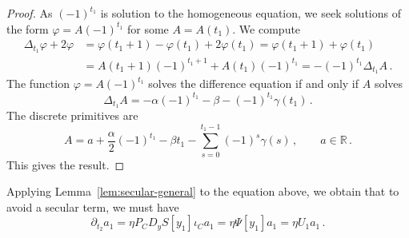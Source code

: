 \documentclass[11pt,english,reqno]{article}
\newcommand{\R}{\mathbb{R}}
\theoremstyle{plain}
\theoremstyle{definition}
\theoremstyle{remark}
\numberwithin{equation}{section}
\begin{document}
    \begin{proof}
        As $(-1)^{t_1}$ is solution to the homogeneous equation, we seek solutions of the form $\varphi = A(-1)^{t_1}$ for some $A = A(t_1)$. We compute
        \begin{align*}
            \Delta_{t_1} \varphi + 2 \varphi &= \varphi(t_1 + 1) - \varphi(t_1) + 2 \varphi(t_1) = \varphi(t_1 + 1) + \varphi(t_1) \\
            &= A(t_1 + 1)(-1)^{t_1 + 1} + A(t_1)(-1)^{t_1} = -(-1)^{t_1} \Delta_{t_1} A \, .
        \end{align*}
        The function $\varphi = A(-1)^{t_1}$ solves the difference equation if and only if $A$ solves
        \begin{equation*}
            \Delta_{t_1} A = - \alpha (-1)^{t_1} - \beta - (-1)^{t_1} \gamma(t_1) \, .
        \end{equation*}
        The discrete primitives are 
        \begin{equation*}
            A = a + \frac{\alpha}{2} (-1)^{t_1} - \beta t_1 - \sum_{s=0}^{t_1-1} (-1)^s \gamma(s) \, , \qquad a \in \R \, .
        \end{equation*}
        This gives the result.
    \end{proof}
    Applying Lemma~\ref{lem:secular-general} to the equation above, we obtain that to avoid a secular term, we must have 
    \begin{equation*}
        \partial_{t_2} a_1 = \eta P_C D_y S[y_1] \iota_C a_1 = \eta \Psi[y_1] a_1 = \eta U_1 a_1 \, .
    \end{equation*}
\end{document}
